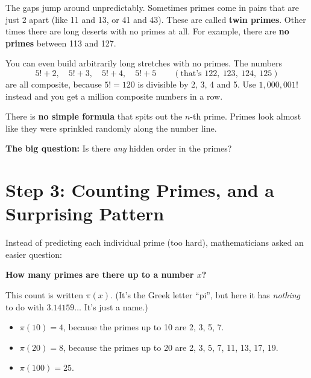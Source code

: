 \documentclass[11pt,a4paper]{article}
\begin{document}
\begin{center}
\end{center}

The gaps jump around unpredictably. Sometimes primes come in pairs that are just 2 apart (like 11 and 13, or 41 and 43). These are called \textbf{twin primes}. Other times there are long deserts with no primes at all. For example, there are \textbf{no primes} between 113 and 127.

You can even build arbitrarily long stretches with no primes. The numbers
\[
5!+2,\quad 5!+3,\quad 5!+4,\quad 5!+5 \qquad (\text{that's } 122,\ 123,\ 124,\ 125)
\]
are all composite, because $5! = 120$ is divisible by 2, 3, 4 and 5. Use $1{,}000{,}001!$ instead and you get a million composite numbers in a row.

There is \textbf{no simple formula} that spits out the $n$-th prime. Primes look almost like they were sprinkled randomly along the number line.

\begin{keybox}
\textbf{The big question:} Is there \emph{any} hidden order in the primes?
\end{keybox}

\section{Step 3: Counting Primes, and a Surprising Pattern}

Instead of predicting each individual prime (too hard), mathematicians asked an easier question:

\begin{keybox}
\textbf{How many primes are there up to a number $x$?}
\end{keybox}

This count is written $\pi(x)$. (It's the Greek letter ``pi'', but here it has \emph{nothing} to do with $3.14159\ldots$ It's just a name.)

\begin{example}
\begin{itemize}[itemsep=1pt,leftmargin=*]
  \item $\pi(10) = 4$, because the primes up to 10 are 2, 3, 5, 7.
  \item $\pi(20) = 8$, because the primes up to 20 are 2, 3, 5, 7, 11, 13, 17, 19.
  \item $\pi(100) = 25$.
\end{itemize}
\end{example}
\end{document}
